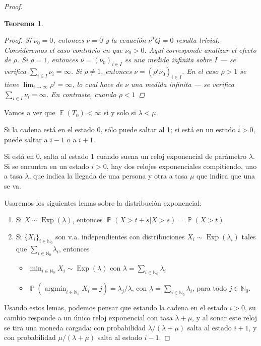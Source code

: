 \documentclass{article}
\DeclareMathOperator{\prob}{\mathbb{P}}
\DeclareMathOperator{\Exp}{\mathbb{E}}
\DeclareMathOperator{\Exponential}{\text{Exp}}
\DeclareMathOperator*{\argmin}{\text{argmín}}
\newcommand{\naturalnum}{\mathbb{N}}
\newtheorem{theorem}{Teorema}
\theoremstyle{definition}
\begin{document}
\begin{proof}
\begin{theorem}
\begin{proof}
Si \(\nu_0 = 0\), entonces \(\nu = 0\) y la ecuación \(\nu^T Q = 0\) resulta trivial.
Consideremos el caso contrario en que \(\nu_0 > 0\).
Aquí corresponde analizar el efecto de \(\rho\).
Si \(\rho = 1\), entonces \(\nu = (\nu_0)_{i \in I}\) es una medida infinita sobre \(I\) --- se verifica \(\sum_{i \in I} \nu_i = \infty\).
Si \(\rho \neq 1\), entonces \(\nu = (\rho^i \nu_0)_{i \in I}\).
En el caso \(\rho > 1\) se tiene \(\lim_{i \rightarrow \infty} \rho^i = \infty\), lo cual hace de \(\nu\) una medida infinita --- se verifica \(\sum_{i \in I} \nu_i = \infty\).
En contraste, cuando \(\rho < 1\)
\end{proof}

\end{theorem}





Vamos a ver que \(\Exp(T_0) < \infty\) si y solo si \(\lambda < \mu\).

Si la cadena está en el estado 0, sólo puede saltar al 1; si está en un estado \(i > 0\), puede saltar a \(i - 1\) o a \(i + 1\).

Si está en 0, salta al estado 1 cuando suena un reloj exponencial de parámetro \(\lambda\).
Si se encuntra en un estado \(i > 0\), hay dos relojes exponenciales compitiendo, uno a tasa \(\lambda\), que indica la llegada de una persona y otra a tasa \(\mu\) que indica que una se va. 

Usaremos los siguientes lemas sobre la distribución exponencial:
\begin{enumerate}
	\item Si \(X \sim \Exponential(\lambda)\), entonces \(\prob(X > t + s | X > s) = \prob(X > t)\).
	\item Si \(\{X_i\}_{i \in \naturalnum_0}\) son v.a. independientes con distribuciones \(X_i \sim \Exponential(\lambda_i)\) tales que \(\sum_{i \in \naturalnum_0} \lambda_i\), entonces
	\begin{itemize}
		\item \(\min_{i \in \naturalnum_0} X_i \sim \Exponential(\lambda)\) con \(\lambda = \sum_{i \in \naturalnum_0} \lambda_i\)
		\item \(\prob(\argmin_{i \in \naturalnum_0} X_i = j) = \lambda_j / \lambda\), con \(\lambda = \sum_{i \in \naturalnum_0} \lambda_i\), para todo \(j \in \naturalnum_0\).
	\end{itemize}
\end{enumerate}

Usando estos lemas, podemos pensar que estando la cadena en el estado \(i > 0\), su cambio responde a un único reloj exponencial con tasa \(\lambda + \mu\), y al sonar este reloj se tira una moneda cargada:
con probabilidad \(\lambda / (\lambda + \mu)\) salta al estado \(i + 1\), y con probabilidad \(\mu / (\lambda + \mu)\) salta al estado \(i - 1\).
\end{proof}
\end{document}
